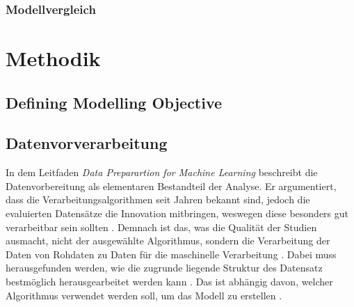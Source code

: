 \documentclass[12pt]{report}
\begin{document}
	\subsection{Modellvergleich}
	
	\chapter{Methodik} %
	\section{Defining Modelling Objective}
	\section{Datenvorverarbeitung}
	In dem Leitfaden \textit{Data Preparartion for Machine Learning} beschreibt \cite{Brownlee.2020} die Datenvorbereitung als elementaren Bestandteil der Analyse. Er argumentiert, dass die Verarbeitungsalgorithmen seit Jahren bekannt sind, jedoch die evaluierten Datensätze die Innovation mitbringen, weswegen diese besonders gut verarbeitbar sein sollten \cite[14]{Brownlee.2020}. Demnach ist das,  was die Qualität der Studien ausmacht, nicht der ausgewählte Algorithmus, sondern die Verarbeitung der Daten von Rohdaten zu Daten für die maschinelle Verarbeitung \cite[9]{Brownlee.2020}. Dabei muss herausgefunden werden, wie die zugrunde liegende Struktur des Datensatz bestmöglich herausgearbeitet werden kann \cite[8]{Brownlee.2020}. Das ist abhängig davon, welcher Algorithmus verwendet werden soll, um das Modell zu erstellen \cite[12]{Brownlee.2020}. 
\end{document}
